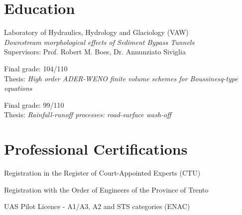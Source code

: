 
\section{Education}

Laboratory of Hydraulics, Hydrology and Glaciology (VAW) \\
\textit{Downstream morphological effects of Sediment Bypass Tunnels} \\
Supervisors: Prof. Robert M. Boes, Dr. Annunziato Siviglia
\sectionsep

Final grade: 104/110 \\
Thesis: \textit{High order ADER-WENO finite volume schemes for Boussinesq-type equations}
\sectionsep

Final grade: 99/110 \\
Thesis: \textit{Rainfall-runoff processes: road-surface wash-off}
\sectionsep

\section{Professional Certifications}

 Registration in the Register of Court-Appointed Experts (CTU)
\sectionsep

 Registration with the Order of Engineers of the Province of Trento
\sectionsep

 UAS Pilot Licence - A1/A3, A2 and STS categories (ENAC)
\sectionsep
